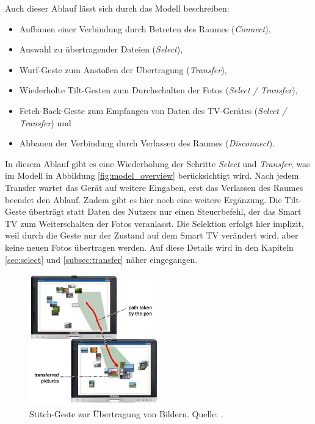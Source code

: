 Auch dieser Ablauf lässt sich durch das Modell beschreiben:
\begin{itemize}
\item Aufbauen einer Verbindung durch Betreten des Raumes (\textit{Connect}),
\item Auswahl zu übertragender Dateien (\textit{Select}),
\item Wurf-Geste zum Anstoßen der Übertragung (\textit{Transfer}),
\item Wiederholte Tilt-Gesten zum Durchschalten der Fotos (\textit{Select / Transfer}),
\item Fetch-Back-Geste zum Empfangen von Daten des TV-Gerätes (\textit{Select / Transfer}) und
\item Abbauen der Verbindung durch Verlassen des Raumes (\textit{Disconnect}).
\end{itemize}

In diesem Ablauf gibt es eine Wiederholung der Schritte \textit{Select} und \textit{Transfer}, was im Modell in Abbildung \ref{fig:model_overview} berücksichtigt wird. Nach jedem Transfer wartet das Gerät auf weitere Eingaben, erst das Verlassen des Raumes beendet den Ablauf. Zudem gibt es hier noch eine weitere Ergänzung. Die Tilt-Geste überträgt statt Daten des Nutzers nur einen Steuerbefehl, der das Smart TV zum Weiterschalten der Fotos veranlasst. Die Selektion erfolgt hier implizit, weil durch die Geste nur der Zustand auf dem Smart TV verändert wird, aber keine neuen Fotos übertragen werden. Auf diese Details wird in den Kapiteln \ref{sec:select} und \ref{subsec:transfer} näher eingegangen.

\begin{figure}[h!]
\centering
\includegraphics[width=0.5\textwidth]{bilder/stitch_general.png}
\caption{Stitch-Geste zur Übertragung von Bildern. Quelle: \citep{Hinckley2004}.}
\label{fig:stitch_general}
\end{figure}


